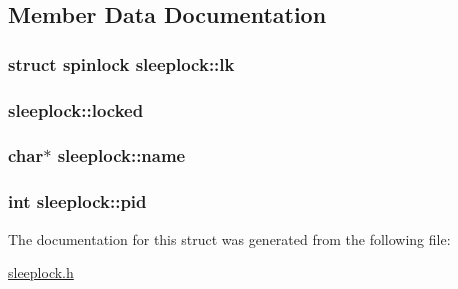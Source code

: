 \subsection{Member Data Documentation}
\subsubsection[{\texorpdfstring{lk}{lk}}]{\setlength{\rightskip}{0pt plus 5cm}struct {\bf spinlock} sleeplock\+::lk}\hypertarget{structsleeplock_a077241ea0e720d228d853208444c4c9d}{}\label{structsleeplock_a077241ea0e720d228d853208444c4c9d}
\subsubsection[{\texorpdfstring{locked}{locked}}]{ sleeplock\+::locked}\hypertarget{structsleeplock_ac5cfe608994a41b24cb1c0fd722910c3}{}\label{structsleeplock_ac5cfe608994a41b24cb1c0fd722910c3}
\subsubsection[{\texorpdfstring{name}{name}}]{\setlength{\rightskip}{0pt plus 5cm}char$\ast$ sleeplock\+::name}\hypertarget{structsleeplock_a40f1db61da688063cd5ac4f72d839590}{}\label{structsleeplock_a40f1db61da688063cd5ac4f72d839590}
\subsubsection[{\texorpdfstring{pid}{pid}}]{\setlength{\rightskip}{0pt plus 5cm}int sleeplock\+::pid}\hypertarget{structsleeplock_a99a4c6a784956ab1c391a12af475a55e}{}\label{structsleeplock_a99a4c6a784956ab1c391a12af475a55e}


The documentation for this struct was generated from the following file\+:\begin{DoxyCompactItemize}
\item 
\hyperlink{sleeplock_8h}{sleeplock.\+h}\end{DoxyCompactItemize}
